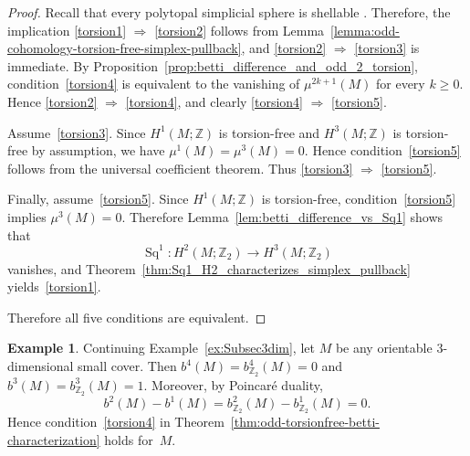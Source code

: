 \documentclass{amsart}
\newcommand{\Z}{\mathbb{Z}}
\DeclareMathOperator{\Sq}{Sq}
\theoremstyle{plain}
\numberwithin{equation}{section}
\theoremstyle{definition}
\newtheorem{example}[theorem]{Example}
\theoremstyle{remark}
\begin{document}
\begin{proof}
Recall that every polytopal simplicial sphere is shellable \cite{Bruggesser-Mani1971}.
Therefore, the implication \eqref{torsion1} $\Rightarrow$ \eqref{torsion2} follows from Lemma~\ref{lemma:odd-cohomology-torsion-free-simplex-pullback}, and \eqref{torsion2} $\Rightarrow$ \eqref{torsion3} is immediate.
By Proposition~\ref{prop:betti_difference_and_odd_2_torsion}, condition~\eqref{torsion4} is equivalent to the vanishing of $\mu^{2k+1}(M)$ for every $k\ge 0$.
Hence \eqref{torsion2} $\Rightarrow$ \eqref{torsion4}, and clearly \eqref{torsion4} $\Rightarrow$ \eqref{torsion5}.

Assume~\eqref{torsion3}.
Since $H^1(M;\Z)$ is torsion-free and $H^3(M;\Z)$ is torsion-free by assumption, we have $\mu^1(M)=\mu^3(M)=0$.
Hence condition~\eqref{torsion5} follows from the universal coefficient theorem.
Thus \eqref{torsion3} $\Rightarrow$ \eqref{torsion5}.

Finally, assume~\eqref{torsion5}.
Since $H^1(M;\Z)$ is torsion-free, condition~\eqref{torsion5} implies $\mu^3(M)=0$.
Therefore Lemma~\ref{lem:betti_difference_vs_Sq1} shows that
$$
    \Sq^1\colon H^2(M;\Z_2)\to H^3(M;\Z_2)
$$
vanishes, and Theorem~\ref{thm:Sq1_H2_characterizes_simplex_pullback} yields~\eqref{torsion1}.

Therefore all five conditions are equivalent.
\end{proof}

\begin{example}
    Continuing Example~\ref{ex:Subsec3dim}, let $M$ be any orientable $3$-dimensional small cover. 
    Then $b^4(M)=b^4_{\Z_2}(M)=0$ and $b^3(M)=b^3_{\Z_2}(M)=1$.
    Moreover, by Poincar\'e duality,
    $$
        b^2(M)-b^1(M)=b^2_{\Z_2}(M)-b^1_{\Z_2}(M)=0.
    $$
    Hence condition~\eqref{torsion4} in Theorem~\ref{thm:odd-torsionfree-betti-characterization} holds for~$M$.
\end{example}
\end{document}
